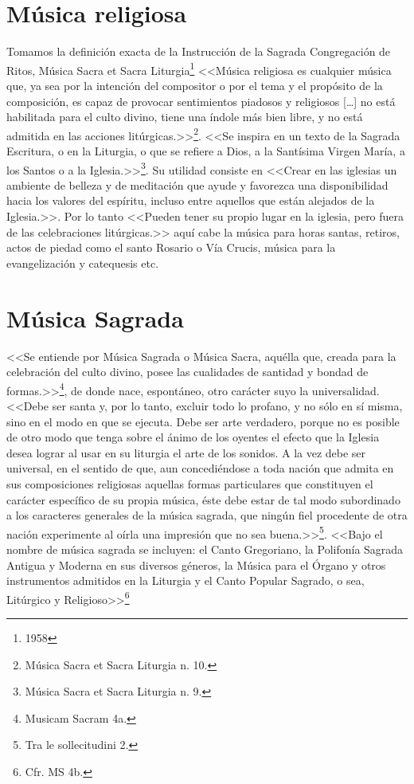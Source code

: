 \documentclass[letterpaper, 12pt]{book}
\begin{document}
    \section{M\'usica religiosa}
    Tomamos la definición exacta de la Instrucci\'on de la Sagrada Congregación de Ritos, M\'usica Sacra et Sacra Liturgia\footnote{1958} <<M\'usica religiosa es cualquier m\'usica que, ya sea por la intenci\'on del compositor o por el tema y el prop\'osito de la composici\'on, es capaz de provocar sentimientos piadosos y religiosos […] no est\'a habilitada para el culto divino, tiene una \'indole m\'as bien libre, y no est\'a admitida en las acciones lit\'urgicas.>>\footnote{M\'usica Sacra et Sacra Liturgia n. 10.}. <<Se inspira en un texto de la Sagrada Escritura, o en la Liturgia, o que se refiere a Dios, a la Sant\'isima Virgen Mar\'ia, a los Santos o a la Iglesia.>>\footnote{M\'usica Sacra et Sacra Liturgia n. 9.}. Su utilidad consiste en <<Crear en las iglesias un ambiente de belleza y de meditaci\'on que ayude y favorezca una disponibilidad hacia los valores del esp\'iritu, incluso entre aquellos que est\'an alejados de la Iglesia.>>. Por lo tanto <<Pueden tener su propio lugar en la iglesia, pero fuera de las celebraciones lit\'urgicas.>> aqu\'i cabe la m\'usica para horas santas, retiros, actos de piedad como el santo Rosario o V\'ia Crucis, m\'usica para la evangelizaci\'on y catequesis etc.
    
    \section{M\'usica Sagrada}
    <<Se entiende por M\'usica Sagrada o M\'usica Sacra, aqu\'ella que, creada para la celebraci\'on del culto divino, posee las cualidades de santidad y bondad de formas.>>\footnote{Musicam Sacram 4a.}, de donde nace, espont\'aneo, otro car\'acter suyo la universalidad. <<Debe ser santa y, por lo tanto, excluir todo lo profano, y no s\'olo en s\'i misma, sino en el modo en que se ejecuta. Debe ser arte verdadero, porque no es posible de otro modo que tenga sobre el \'animo de los oyentes el efecto que la Iglesia desea lograr al usar en su liturgia el arte de los sonidos. A la vez debe ser universal, en el sentido de que, aun concedi\'endose a toda naci\'on que admita en sus composiciones religiosas aquellas formas particulares que constituyen el car\'acter espec\'ifico de su propia m\'usica, \'este debe estar de tal modo subordinado a los caracteres generales de la música sagrada, que ning\'un fiel procedente de otra naci\'on experimente al o\'irla una impresión que no sea buena.>>\footnote{Tra le sollecitudini 2.}. <<Bajo el nombre de música sagrada se incluyen: el Canto Gregoriano, la Polifon\'ia Sagrada Antigua y Moderna en sus diversos g\'eneros, la M\'usica para el \'Organo y otros instrumentos admitidos en la Liturgia y el Canto Popular Sagrado, o sea, Lit\'urgico y Religioso>>\footnote{Cfr. MS 4b.} \newline
    
\end{document}
